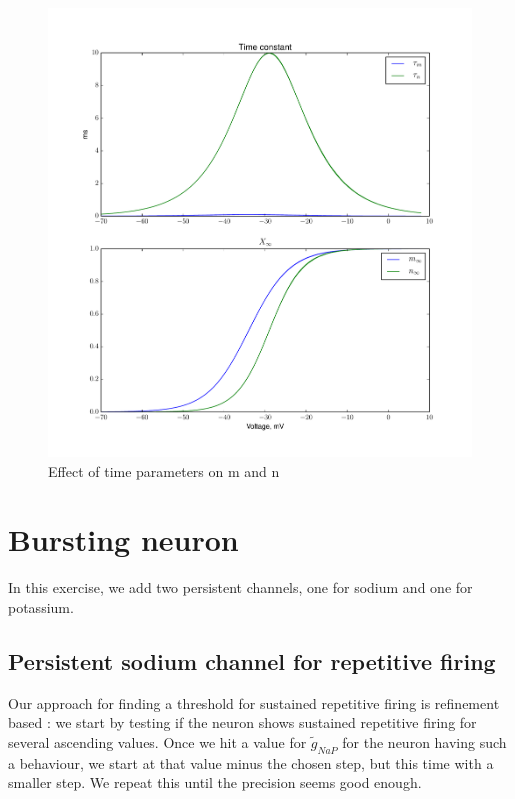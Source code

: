 \documentclass[a4paper,11pt]{article} %
\begin{document}
\begin{figure}[H]
    \centering
    \includegraphics[width=\textwidth]{tau_inf}
    \caption{Effect of time parameters on m and n}
    \label{fig:tau_inf}
\end{figure}

\section{Bursting neuron}

In this exercise, we add two persistent channels, one for sodium
and one for potassium.

\subsection{Persistent sodium channel for repetitive firing}

Our approach for finding a threshold for sustained repetitive
firing is refinement based : we start by testing if the neuron
shows sustained repetitive firing for several ascending values.
Once we hit a value for $\tilde{g}_{NaP}$ for the neuron having
such a behaviour, we start at that value minus the chosen step,
but this time with a smaller step. We repeat this until the
precision seems good enough.
\end{document}
